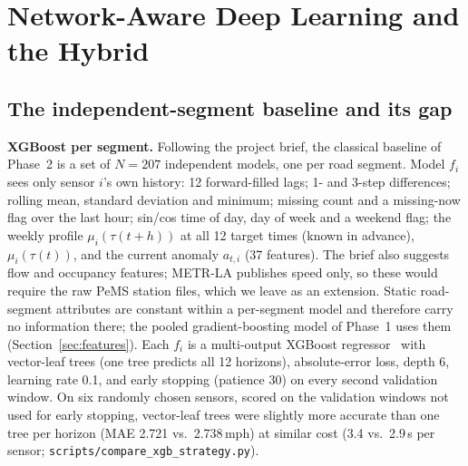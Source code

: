 \section{Network-Aware Deep Learning and the Hybrid}
\label{sec:deep}

\subsection{The independent-segment baseline and its gap}
\label{sec:gap}
\textbf{XGBoost per segment.} Following the project brief, the classical baseline
of Phase~2 is a set of $N{=}207$ independent models, one per road segment. Model
$f_i$ sees only sensor $i$'s own history: 12 forward-filled lags; 1- and 3-step
differences; rolling mean, standard deviation and minimum; missing count and a
missing-now flag over the last hour; sin/cos time of day, day of week and a weekend
flag; the weekly profile $\mu_i(\tau(t{+}h))$ at all 12 target times (known in
advance), $\mu_i(\tau(t))$, and the current anomaly $a_{t,i}$ (37 features). The
brief also suggests flow and occupancy features; METR-LA publishes speed only, so
these would require the raw PeMS station files, which we leave as an extension.
Static road-segment attributes are constant within a per-segment model and
therefore carry no information there; the pooled gradient-boosting model of
Phase~1 uses them (Section~\ref{sec:features}). Each
$f_i$ is a multi-output XGBoost regressor~\cite{chen2016xgboost} with vector-leaf
trees (one tree predicts all 12 horizons), absolute-error loss, depth 6, learning
rate 0.1, and early stopping (patience 30) on every second validation window. On six
randomly chosen sensors, scored on the validation windows not used for early
stopping, vector-leaf trees were slightly more accurate than one tree per horizon
(MAE 2.721 vs.\ 2.738\,mph) at similar cost (3.4 vs.\ 2.9\,s per sensor;
\texttt{scripts/compare\_xgb\_strategy.py}).

